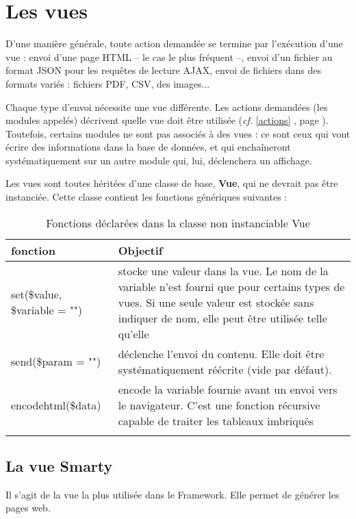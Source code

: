 \chapter{Les vues}\label{vue}

D'une manière générale, toute action demandée se termine par l'exécution d'une vue : envoi d'une page HTML -- le cas le plus fréquent --, envoi d'un fichier au format JSON pour les requêtes de lecture AJAX, envoi de fichiers dans des formats variés : fichiers PDF, CSV, des images...

Chaque type d'envoi nécessite une vue différente. Les actions demandées (les modules appelés) décrivent quelle vue doit être utilisée (\textit{cf.} \ref{actions} \textit{}, page \pageref{actions}). Toutefois, certains modules ne sont pas associés à des vues : ce sont ceux qui vont écrire des informations dans la base de données, et qui enchaîneront systématiquement sur un autre module qui, lui, déclenchera un affichage.

Les vues sont toutes héritées d'une classe de base, \textbf{Vue}, qui ne devrait pas être instanciée. Cette classe contient les fonctions génériques suivantes :

\begin{longtable}{|p{5cm}|p{8cm}|}
\hline
\textbf{fonction} & \textbf{Objectif} \\
\hline
\endhead

set(\$value, \$variable = "") & stocke une valeur dans la vue. Le nom de la variable n'est fourni que pour certains types de vues. Si une seule valeur est stockée sans indiquer de nom, elle peut être utilisée telle qu'elle \\
\hline
send(\$param = "") & déclenche l'envoi du contenu. Elle doit être systématiquement réécrite (vide par défaut). \\
\hline
encodehtml(\$data) & encode la variable fournie avant un envoi vers le navigateur. C'est une fonction récursive capable de traiter les tableaux imbriqués \\
\hline

\caption{Fonctions déclarées dans la classe non instanciable Vue}
\end{longtable}

\section{La vue Smarty}

Il s'agit de la vue la plus utilisée dans le Framework. Elle permet de générer les pages web.

